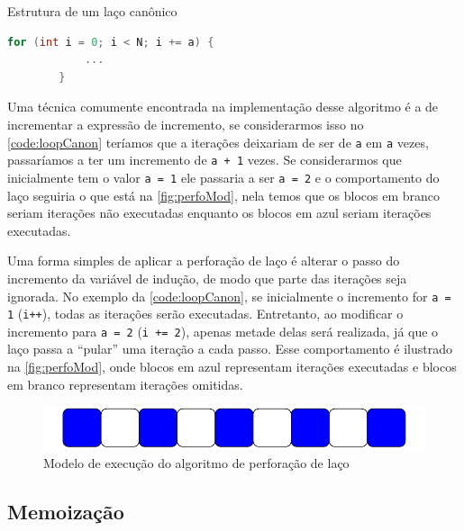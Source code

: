 \begin{sourcecode}[htb]\caption{\label{code:loopCanon}Estrutura de um laço canônico}
    \begin{lstlisting}[frame=single, language=C++]
        for (int i = 0; i < N; i += a) {
            ...
        }
    \end{lstlisting}
    \fonte{}
\end{sourcecode}

Uma técnica comumente encontrada na implementação desse algoritmo é a de incrementar a expressão de incremento, se considerarmos isso no \autoref{code:loopCanon} teríamos que a iterações deixariam de ser de \texttt{a} em \texttt{a} vezes, passaríamos a ter um incremento de \texttt{a + 1} vezes. Se considerarmos que inicialmente tem o valor \texttt{a = 1} ele passaria a ser \texttt{a = 2} e o comportamento do laço seguiria o que está na \autoref{fig:perfoMod}, nela temos que os blocos em branco seriam iterações não executadas enquanto os blocos em azul seriam iterações executadas.

Uma forma simples de aplicar a perforação de laço é alterar o passo do incremento da variável de indução, de modo que parte das iterações seja ignorada. No exemplo da \autoref{code:loopCanon}, se inicialmente o incremento for \texttt{a = 1} (\texttt{i++}), todas as iterações serão executadas. Entretanto, ao modificar o incremento para \texttt{a = 2} (\texttt{i += 2}), apenas metade delas será realizada, já que o laço passa a “pular” uma iteração a cada passo. Esse comportamento é ilustrado na \autoref{fig:perfoMod}, onde blocos em azul representam iterações executadas e blocos em branco representam iterações omitidas.

\begin{figure}[htb]
    \caption{Modelo de execução do algoritmo de perforação de laço}
    \label{fig:perfoMod}
    \includegraphics[scale=0.7]{figuras/loop_perfo.pdf}
    \fonte{}
\end{figure}

\subsection{Memoização}\label{subsec:memo}

